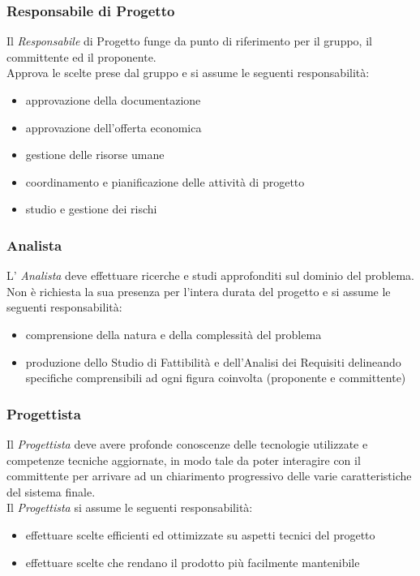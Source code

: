 \subsubsection{Responsabile  di Progetto}
Il  \emph{Responsabile}  di Progetto funge da punto di riferimento per
il gruppo, il committente ed il proponente.\\ Approva
le scelte prese dal gruppo e si assume le seguenti responsabilità: 
\begin{itemize}
	\item approvazione della documentazione
	\item approvazione dell'offerta economica
	\item gestione delle risorse umane
	\item coordinamento e pianificazione delle attività di progetto
	\item studio e gestione dei rischi
\end{itemize}
\subsubsection{Analista}
L' \emph{Analista}  deve effettuare ricerche e studi approfonditi sul
dominio del problema. Non è richiesta la sua presenza per l'intera
durata del progetto e si assume le seguenti responsabilità: 
\begin{itemize}
	\item comprensione della natura e della complessità del problema
	\item produzione dello Studio di Fattibilità e
	dell'Analisi dei Requisiti delineando specifiche comprensibili
	ad ogni figura coinvolta (proponente e committente)
\end{itemize}
\subsubsection{Progettista}
Il  \emph{Progettista}  deve avere profonde conoscenze delle
tecnologie utilizzate e competenze tecniche aggiornate, in modo tale
da poter interagire con il committente per arrivare ad un chiarimento 
progressivo delle varie caratteristiche del sistema finale.\\Il  \emph{Progettista}  si assume le seguenti responsabilità:
\begin{itemize}
	\item effettuare scelte efficienti ed ottimizzate su aspetti tecnici del progetto
	\item effettuare scelte che rendano il prodotto più facilmente mantenibile
\end{itemize}
